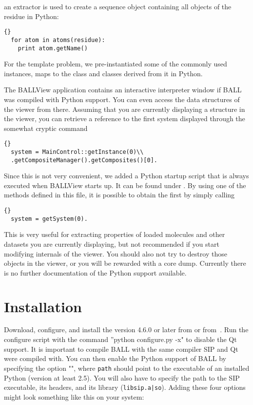 \noindent
an  extractor is used to create a sequence object containing
all objects of the residue in Python:

\begin{lstlisting}{}
  for atom in atoms(residue):
    print atom.getName()
\end{lstlisting}

For the template problem, we pre-instantiated some of the 
commonly used instances, \eg {} maps to the 
 class and classes derived from it in Python.

The BALLView application contains an interactive interpreter window
if BALL was compiled with Python support. You can even access the
data structures of the viewer from there. Assuming that you are
currently displaying a structure in the viewer, you can retrieve a
reference to the first system displayed through the somewhat cryptic
command 

\begin{lstlisting}{}
  system = MainControl::getInstance(0)\\
  .getCompositeManager().getComposites()[0].
\end{lstlisting}

\noindent
Since this is not very convenient, we added a Python startup script that is 
always executed when \mbox{BALLView} starts up. It can be found under 
. By using one of the methods defined in this file,
it is possible to obtain the first  by simply calling

\begin{lstlisting}{}
  system = getSystem(0).
\end{lstlisting}

\noindent
This is very useful for extracting properties of loaded molecules and other 
datasets you are currently displaying, but not recommended if you start 
modifying internals of the viewer. You should also not try to destroy those 
objects in the viewer, or you will be rewarded with a core dump. Currently 
there is no further documentation of the Python support available.
		

\section{Installation}

Download, configure, and install the  version 4.6.0 or later from 
 or from~\cite{SIP}.
Run the configure script with the command ''python configure.py -x" to disable 
the Qt support. It is important to compile BALL with the same \CPP compiler SIP
and Qt were compiled with. You can then enable the Python support of BALL
by specifying the option \mbox{""}, where
{\tt path} should point to the executable of an installed Python (version at
least 2.5). You will also have to specify the path to the SIP executable, its
headers, and its library ({\tt libsip.a|so}). Adding these four options might
look something like this on your system:

